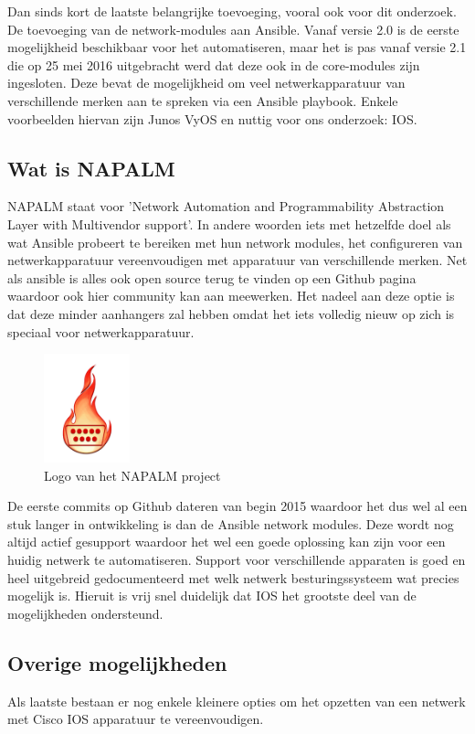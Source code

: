 Dan sinds kort de laatste belangrijke toevoeging, vooral ook voor dit onderzoek. De toevoeging van de network-modules aan Ansible. Vanaf versie 2.0 is de eerste mogelijkheid beschikbaar voor het automatiseren, maar het is pas vanaf versie 2.1 die op 25 mei 2016 uitgebracht werd dat deze ook in de core-modules zijn ingesloten. Deze bevat de mogelijkheid om veel netwerkapparatuur van verschillende merken aan te spreken via een Ansible playbook. Enkele voorbeelden hiervan zijn Junos VyOS en nuttig voor ons onderzoek: IOS.
 \autocite{ansible2}
 
\subsection{Wat is NAPALM}
\label{sec:napalm}
NAPALM staat voor 'Network Automation and Programmability Abstraction Layer with Multivendor support'. In andere woorden iets met hetzelfde doel als wat Ansible probeert te bereiken met hun network modules, het configureren van netwerkapparatuur vereenvoudigen met apparatuur van verschillende merken. Net als ansible is alles ook open source terug te vinden op een Github pagina waardoor ook hier community kan aan meewerken. Het nadeel aan deze optie is dat deze minder aanhangers zal hebben omdat het iets volledig nieuw op zich is speciaal voor netwerkapparatuur.\autocite{napalmGithub} 
\begin{figure}[H]
\centering
\includegraphics[width=2.5cm]{../img/napalmlogo}
\caption{Logo van het NAPALM project}
\end{figure}
De eerste commits op Github dateren van begin 2015 waardoor het dus wel al een stuk langer in ontwikkeling is dan de Ansible network modules. Deze wordt nog altijd actief gesupport waardoor het wel een goede oplossing kan zijn voor een huidig netwerk te automatiseren. Support voor verschillende apparaten is goed en heel uitgebreid gedocumenteerd met welk netwerk besturingssysteem wat precies mogelijk is. Hieruit is vrij snel duidelijk dat IOS het grootste deel van de mogelijkheden ondersteund.\autocite{napalmSupport}

\subsection{Overige mogelijkheden}
\label{sec:overige}
Als laatste bestaan er nog enkele kleinere opties om het opzetten van een netwerk met Cisco IOS apparatuur te vereenvoudigen. 
\\

